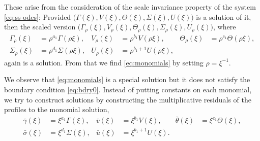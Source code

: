 \documentclass[a4paper,11pt]{article}
\def\bg{{\bar{\gamma}}}
\def\bv{{\bar{v}}}
\def\bth{{\bar{\theta}}}
\def\bs{{\bar{\sigma}}}
\def\bu{{\bar{u}}}
\begin{document}
These arise from the consideration of the scale invariance property of the system \eqref{eq:ss-odes}: Provided $\big(\Gamma(\xi), V(\xi), \Theta(\xi), \Sigma(\xi), U(\xi)\big)$ is a solution of it, then the scaled version $\big(\Gamma_\rho(\xi), V_\rho(\xi), \Theta_\rho(\xi), \Sigma_\rho(\xi), U_\rho(\xi)\big)$, where
\begin{align*}
 \Gamma_\rho(\xi)&=\rho^{a_1}\Gamma(\rho\xi), & V_\rho(\xi)&=\rho^{b_1}V(\rho\xi), & \Theta_\rho(\xi)&=\rho^{c_1}\Theta(\rho\xi),\\
 \Sigma_\rho(\xi)&=\rho^{d_1}\Sigma(\rho\xi), & U_\rho(\xi)&=\rho^{b_1+1}U(\rho\xi),
\end{align*}
again is a solution. From that we find \eqref{eq:monomials} by setting $\rho=\xi^{-1}$.

We observe that \eqref{eq:monomials} is a special solution but it does not satisfy the boundary condition \eqref{eq:bdry0}. Instead of putting constants on each monomial, we try to construct solutions by constructing the multiplicative residuals of the profiles to the monomial solution,
\begin{equation} \label{eq:CAPtoBAR}
\begin{aligned}
 \bg(\xi)&=\xi^{a_1}\Gamma(\xi), &
 \bv(\xi)&=\xi^{b_1}V(\xi), &
 \bth(\xi)&=\xi^{c_1}\Theta(\xi), \\
 \bs(\xi)&=\xi^{d_1}\Sigma(\xi), &
 \bu(\xi)&=\xi^{b_1+1}U(\xi).
\end{aligned}
\end{equation}
\end{document}
